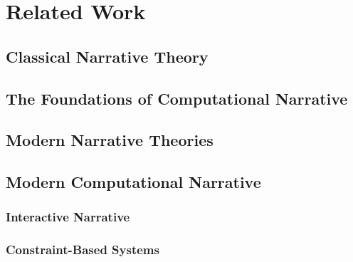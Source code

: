 \chapter{Related Work}

\label{ch:related-work}

\section{Classical Narrative Theory}

\cite{Aristotle1917}
\cite{Freytag1894}
\cite{Forster1927}
\cite{Propp1973}


\section{The Foundations of Computational Narrative}

\cite{Klein1971, Klein1973}
\cite{Meehan1976}
\cite{Lebowitz1984}


\section{Modern Narrative Theories}

\cite{Iran-Nejad1987}
\cite{Oatley1995, Oatley1999}
\cite{Mar2004, Mar2008}
\cite{Zunshine2006}


\section{Modern Computational Narrative}


\subsection{Interactive Narrative}

\cite{Laurel1986}


\subsection{Constraint-Based Systems}


